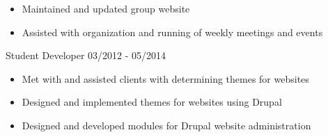 \documentclass[11pt]{article} %
\begin{document}
\begin{description}
\begin{itemize}
  \item Maintained and updated group website
  \item Assisted with organization and running of weekly meetings and events
\end{itemize}


           {Student Developer}
           {03/2012 - 05/2014}

\begin{itemize}
  \item Met with and assisted clients with determining themes for websites
  \item Designed and implemented themes for websites using Drupal 
  \item Designed and developed modules for Drupal website administration
\end{itemize}

\end{description}
\end{document}
